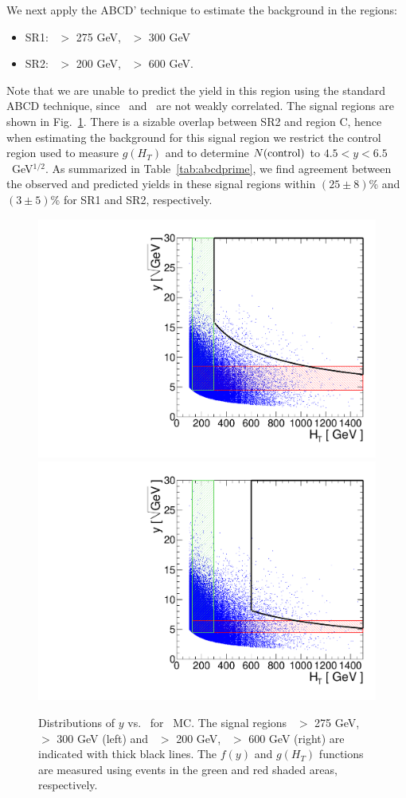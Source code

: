 We next apply the ABCD' technique to estimate the background in the regions:

\begin{itemize}
\item SR1: \met\ $>$ 275 GeV, \Ht\ $>$ 300 GeV
\item SR2: \met\ $>$ 200 GeV, \Ht\ $>$ 600 GeV. 
\end{itemize}

Note that we are unable to predict the yield in this region using
the standard ABCD technique, since \met\ and \Ht\ are not weakly correlated. The signal
regions are shown in Fig.~\ref{fig:abcdprime_met}. There is a sizable overlap between
SR2 and region C, hence when estimating the background for this signal region we
restrict the control region used to measure $g(H_T)$ and to determine  $N({\rm control})$ 
to $4.5 < y < 6.5$~GeV$^{1/2}$.
As summarized in Table~\ref{tab:abcdprime}, we find agreement between the observed and
predicted yields in these signal regions within $(25 \pm 8)$\% and $(3 \pm 5)$\% for SR1 and SR2, respectively. 

\begin{figure}[hbt]
\begin{center}
\includegraphics[width=0.48\linewidth]{plots/abcdprime_met275_ht300.pdf}
\includegraphics[width=0.48\linewidth]{plots/abcdprime_met200_ht600.pdf}
\caption{\label{fig:abcdprime_met}\protect 
Distributions of $y$ vs. \Ht\ for \ttbar\ MC. The signal regions \met\ $>$ 275 GeV, \Ht\ $>$ 300 GeV (left)
and \met\ $>$ 200 GeV, \Ht\ $>$ 600 GeV (right) are indicated with thick black lines. The $f(y)$ and $g(H_T)$ 
functions are measured using events in the green and red shaded areas, respectively.
}
\end{center}
\end{figure}


